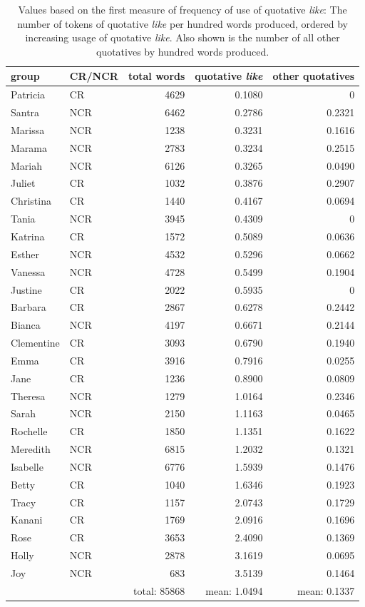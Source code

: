   
  

  \begin{table}[htbp]
\caption{Values based on the first measure of frequency of use of quotative \textit{like}: The number of tokens of quotative \textit{like} per hundred words produced, ordered by increasing usage of quotative \textit{like}.  Also shown is the number of all other quotatives by hundred words produced.}
  \label{tab:percentquote}
	 \begin{center}
		\begin{tabular}{llrrr}\hline
	
group & CR/NCR &  total words & quotative \textit{like} & other quotatives \\
  \hline

Patricia	& CR &  4629	& 0.1080 & 0 \\
Santra	& NCR & 6462	& 0.2786 & 0.2321 \\
Marissa	& NCR & 1238	& 0.3231 & 0.1616 \\
Marama & NCR & 	2783	& 0.3234 & 0.2515 \\
Mariah & NCR & 	6126	& 0.3265 & 0.0490 \\
Juliet & CR & 1032 &	0.3876 & 0.2907 \\
Christina	& CR & 1440	& 0.4167 & 0.0694 \\
Tania	& NCR & 3945 &	0.4309 &  0 \\
Katrina	& CR & 1572 &	0.5089 & 0.0636 \\
Esther & NCR &	4532	& 0.5296 &  0.0662 \\
Vanessa	& NCR & 4728	& 0.5499 &  0.1904 \\
Justine	& CR & 2022	& 0.5935 &  0 \\
Barbara	& CR & 2867	& 0.6278 &  0.2442 \\
Bianca	& NCR & 4197	& 0.6671 & 0.2144 \\
Clementine & CR & 	3093	& 0.6790 &  0.1940 \\
Emma & CR &	3916	& 0.7916 &  0.0255 \\
Jane	& CR & 1236	& 0.8900 &  0.0809 \\
Theresa	& NCR & 1279	& 1.0164 &  0.2346 \\
Sarah	& NCR & 2150	& 1.1163 & 0.0465 \\
Rochelle & CR &	1850	& 1.1351 & 0.1622 \\
Meredith	& NCR & 6815	& 1.2032 & 0.1321 \\
Isabelle	& NCR & 6776	& 1.5939 & 0.1476 \\
Betty	& CR & 1040	& 1.6346 & 0.1923 \\
Tracy	& CR & 1157	& 2.0743 & 0.1729 \\
Kanani & CR	& 1769	& 2.0916 & 0.1696 \\
Rose & CR &	3653	& 2.4090 & 0.1369 \\
Holly	& NCR & 2878	& 3.1619 & 0.0695 \\
Joy & NCR &	683	& 3.5139 & 0.1464 \\
 & &  total: 85868	& mean: 1.0494 & mean: 0.1337 \\


\end{tabular}
\end{center}
\end{table}
